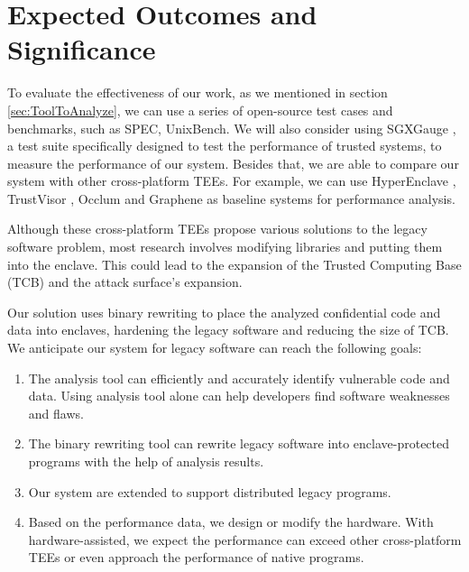 \section{Expected Outcomes and Significance}
To evaluate the effectiveness of our work, as we mentioned in section
\ref{sec:ToolToAnalyze}, we can use a series of open-source test cases and benchmarks,
such as SPEC, UnixBench.
We will also consider using SGXGauge \cite{Kumar2022ACB}, a test suite specifically
designed to test the performance of trusted systems, to measure the performance
of our system.
Besides that, we are able to compare our system with other cross-platform TEEs.
For example, we can use HyperEnclave \cite{Jia2022HyperEnclaveAO}, TrustVisor
\cite{McCune2010TrustVisorET}, Occlum \cite{Shen2020OcclumSA} and Graphene
\cite{Tsai2017GrapheneSGXAP} as baseline systems for performance analysis.

Although these cross-platform TEEs propose various solutions to the legacy
software problem, most research involves modifying libraries and putting
them into the enclave.
This could lead to the expansion of the Trusted Computing Base (TCB)
and the attack surface's expansion.

Our solution uses binary rewriting to place the analyzed confidential code and data
into enclaves, hardening the legacy software and reducing the size of TCB.
We anticipate our system for legacy software can reach the following goals:
\begin{enumerate}[(1)]
    \item The analysis tool can efficiently and accurately identify vulnerable code and data.
    Using analysis tool alone can help developers find software weaknesses and flaws.
    \item The binary rewriting tool can rewrite legacy software into enclave-protected programs
    with the help of analysis results.
    \item Our system are extended to support distributed legacy programs.
    \item Based on the performance data, we design or modify the hardware.
    With hardware-assisted, we expect the performance can exceed other cross-platform TEEs
    or even approach the performance of native programs.
\end{enumerate}